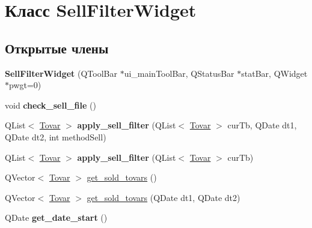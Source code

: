 \hypertarget{class_sell_filter_widget}{\section{Класс \-Sell\-Filter\-Widget}
\label{class_sell_filter_widget}
}
\subsection*{Открытые члены}
\begin{DoxyCompactItemize}
\item 
\hypertarget{class_sell_filter_widget_ab149a8c15edfbe23b189b1b07e29a996}{{\bfseries \-Sell\-Filter\-Widget} (\-Q\-Tool\-Bar $\ast$ui\-\_\-main\-Tool\-Bar, \-Q\-Status\-Bar $\ast$stat\-Bar, \-Q\-Widget $\ast$pwgt=0)}\label{class_sell_filter_widget_ab149a8c15edfbe23b189b1b07e29a996}

\item 
\hypertarget{class_sell_filter_widget_a1098fdc1b005b7ae6c34b169b6285628}{void {\bfseries check\-\_\-sell\-\_\-file} ()}\label{class_sell_filter_widget_a1098fdc1b005b7ae6c34b169b6285628}

\item 
\hypertarget{class_sell_filter_widget_a7c6005c4bd9f9f3fec09df5447876188}{\-Q\-List$<$ \hyperlink{struct_tovar}{\-Tovar} $>$ {\bfseries apply\-\_\-sell\-\_\-filter} (\-Q\-List$<$ \hyperlink{struct_tovar}{\-Tovar} $>$ cur\-Tb, \-Q\-Date dt1, \-Q\-Date dt2, int method\-Sell)}\label{class_sell_filter_widget_a7c6005c4bd9f9f3fec09df5447876188}

\item 
\hypertarget{class_sell_filter_widget_a3a70cd8b7bbc0665db0c0bc74e556adb}{\-Q\-List$<$ \hyperlink{struct_tovar}{\-Tovar} $>$ {\bfseries apply\-\_\-sell\-\_\-filter} (\-Q\-List$<$ \hyperlink{struct_tovar}{\-Tovar} $>$ cur\-Tb)}\label{class_sell_filter_widget_a3a70cd8b7bbc0665db0c0bc74e556adb}

\item 
\-Q\-Vector$<$ \hyperlink{struct_tovar}{\-Tovar} $>$ \hyperlink{class_sell_filter_widget_ad4cb4e729168f060eb02b483e0500b20}{get\-\_\-sold\-\_\-tovars} ()
\item 
\-Q\-Vector$<$ \hyperlink{struct_tovar}{\-Tovar} $>$ \hyperlink{class_sell_filter_widget_a4c3b63cb7a8468d3e3c3a0dce22c7459}{get\-\_\-sold\-\_\-tovars} (\-Q\-Date dt1, \-Q\-Date dt2)
\item 
\hypertarget{class_sell_filter_widget_a0e2e7dee068d5701c22f466a4e4ac34d}{\-Q\-Date {\bfseries get\-\_\-date\-\_\-start} ()}\label{class_sell_filter_widget_a0e2e7dee068d5701c22f466a4e4ac34d}


\end{DoxyCompactItemize}
